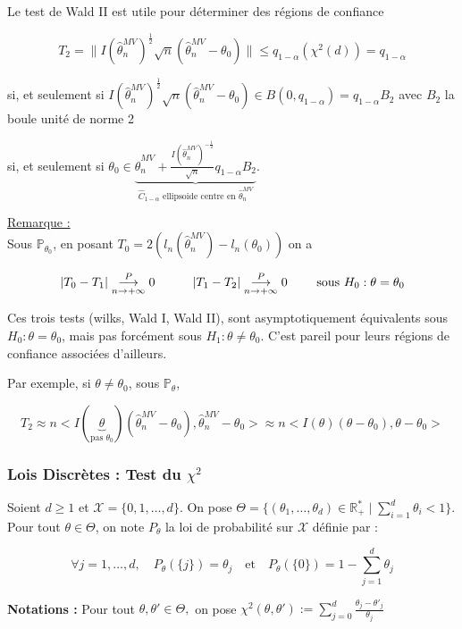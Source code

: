 \documentclass[12pt]{article}
\newcommand{\espace}{\vspace{1.5em}}
\newcommand{\petitespace}{\vspace{0.5cm}}
\newcommand{\shift}{\hspace{2em}}
\newcommand{\bb}[1]{\mathbb{#1}} %
\newcommand{\R}{\bb{R}} %
\renewcommand{\P}{\bb{P}}%
\newcommand{\Rq}{\underline{Remarque :} \\}
\newcommand{\somme}[2]{\sum\limits_{#1}^{#2}}
\renewcommand{\cal}{\mathcal}
\newcommand{\norme}[1]{\lVert #1 \rVert}
\newcommand{\chideux}[1]{\chi^2(#1)} %
\newcommand{\EMV}{\widehat{\theta}_n^{MV}}
\newcommand{\1}{\bb{1}} %
\newcommand{\cvn}{\underset{n\rightarrow+\infty}{\longrightarrow}} %
\newcommand{\cvP}{\overset{P}{\cvn}} %
\begin{document}
\espace


Le test de Wald II est utile pour déterminer des régions de confiance 

$$T_2 = \norme{I(\EMV)^{\frac 12} \sqrt n (\EMV-\theta_0)} \le q_{1-\alpha}(\chideux{d}) =q_{1-\alpha}$$\petitespace

si, et seulement si $I(\EMV)^{\frac 12} \sqrt n (\EMV-\theta_0) \in B(0, q_{1-\alpha}) = q_{1-\alpha}B_2$ avec $B_2$ la boule unité de norme 2\espace

si, et seulement si $\theta_0 \in \underbrace{\EMV + \frac{I(\EMV)^{- \frac 12}}{\sqrt n}q_{1-\alpha}B_2}_{\widehat C_{1-\alpha}  \text{ ellipsoide centre en $\EMV$}} $.

\Rq

Sous $\P_{\theta_0}$, en posant $T_0 = 2(l_n(\EMV)-l_n(\theta_0))$ on a \espace

\begin{equation*}
|T_0-T_1| \cvP 0  \quad\quad\quad  |T_1-T_2| \cvP 0 \text{ \shift sous $H_0 : \theta=\theta_0$}
\end{equation*}


Ces trois tests (wilks, Wald I, Wald II), sont asymptotiquement équivalents sous $H_0 : \theta = \theta_0$, mais pas forcément sous $H_1 : \theta \ne \theta_0$. C'est pareil pour leurs régions de confiance associées d'ailleurs. \petitespace

Par exemple, si $\theta \ne \theta_0$, sous $\P_\theta$, 

$$T_2 \approx n <I(\underbrace{\theta}_{\text{pas } \theta_0})(\EMV-\theta_0), \EMV-\theta_0> \approx n< I(\theta)(\theta-\theta_0), \theta-\theta_0 > $$

\espace


\subsubsection{Lois Discrètes : Test du $\chi^2$}\espace


Soient $d \ge 1$ et $\cal X = \{0,1, \ldots, d \}$. On pose $\Theta = \{ (\theta_1, \ldots, \theta_d)\in \R^*_+ \mid \somme{i=1}{d} \theta_i <1  \} $. Pour tout $\theta \in \Theta$, on note $P_\theta$ la loi de probabilité sur $\cal X$ définie par :

$$\forall j=1, \ldots,d, \quad P_\theta(\{ j\} )= \theta_j \quad \text{et} \quad P_\theta(\{ 0\} )=1-\somme{j=1}{d} \theta_j$$

\petitespace


\textbf{Notations :} Pour tout $\theta, \theta' \in \Theta,$ on pose $\chi^2(\theta, \theta') := \somme{j=0}{d}\frac{\theta_j-\theta'_j}{\theta_j}$\petitespace
\end{document}
